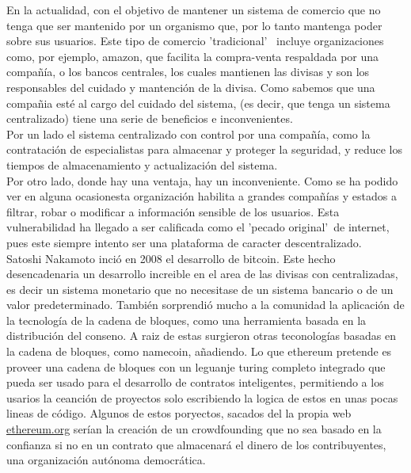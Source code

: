\documentclass[11pt,a4paper]{article}
\begin{document}
En la actualidad, con el objetivo de mantener un sistema de comercio que no tenga que ser mantenido por un organismo que, por lo tanto mantenga poder sobre sus usuarios. Este tipo de comercio 'tradicional' \ incluye organizaciones como, por ejemplo, amazon, que facilita la compra-venta respaldada por una compañía, o los bancos centrales, los cuales mantienen las divisas y son los responsables del cuidado y mantención de la divisa. Como sabemos que una compañia esté al cargo del cuidado del sistema, (es decir, que tenga un sistema centralizado) tiene una serie de beneficios e inconvenientes. \\

Por un lado el sistema centralizado con control por una compañía, como la contratación de especialistas para almacenar y proteger la seguridad, y reduce los tiempos de almacenamiento y actualización del sistema. \\

Por otro lado, donde hay una ventaja, hay un inconveniente. Como se ha podido ver en alguna ocasion\footnotemark esta organización habilita a grandes compañías y estados a filtrar, robar o modificar a información sensible  de los usuarios. Esta vulnerabilidad ha llegado a ser calificada como el 'pecado original'\ de internet, pues este siempre intento ser una plataforma de caracter descentralizado.\\

	Satoshi Nakamoto inció en 2008 el desarrollo de bitcoin. Este hecho desencadenaria un desarrollo increible en el area de las divisas con centralizadas, es decir un sistema monetario que no necesitase de un sistema bancario o de un valor predeterminado. También sorprendió mucho a la comunidad la aplicación de la tecnología de la cadena de bloques, como una herramienta basada en la distribución del conseno. A raiz de estas surgieron otras teconologías basadas en la cadena de bloques, como namecoin, añadiendo. Lo que ethereum pretende es proveer una cadena de bloques con un leguanje turing completo integrado que pueda ser usado para el desarrollo de contratos inteligentes, permitiendo a los usarios la ceanción de proyectos solo escribiendo la logica de estos en unas pocas lineas de código. Algunos de estos poryectos, sacados del la propia web \url{ethereum.org} serían la creación de un crowdfounding que no sea basado en la confianza si no en un contrato que almacenará el dinero de los contribuyentes, una organización autónoma democrática.\\

\end{document}
